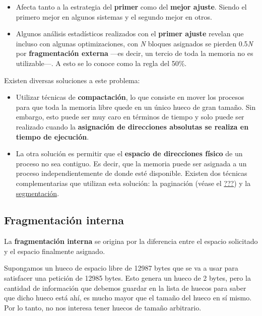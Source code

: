 \begin{itemize}
\item
  Afecta tanto a la estrategia del \textbf{primer} como del
  \textbf{mejor ajuste}. Siendo el primero mejor en algunos sistemas y
  el segundo mejor en otros.
\item
  Algunos análisis estadísticos realizados con el \textbf{primer ajuste}
  revelan que incluso con algunas optimizaciones, con \emph{N} bloques
  asignados se pierden 0.5\emph{N} por \textbf{fragmentación externa}
  ---es decir, un tercio de toda la memoria no es utilizable---. A esto
  se lo conoce como la regla del 50\%.
\end{itemize}

Existen diversas soluciones a este problema:

\begin{itemize}
\item
  Utilizar técnicas de \textbf{{}compactación}, lo que consiste en mover
  los procesos para que toda la memoria libre quede en un único hueco de
  gran tamaño. Sin embargo, esto puede ser muy caro en términos de
  tiempo y solo puede ser realizado cuando la \textbf{asignación de
  direcciones absolutas se realiza en tiempo de ejecución}.
\item
  La otra solución es permitir que el \textbf{espacio de direcciones
  físico} de un proceso no sea contiguo. Es decir, que la memoria puede
  ser asignada a un proceso independientemente de donde esté disponible.
  Existen dos técnicas complementarias que utilizan esta solución: la
  paginación (véase el \hyperref[paginaciuxf3n]{???}) y la
  \href{https://es.wikipedia.org/wiki/Segmentaci\%C3\%B3n_de_memoria}{segmentación}.
\end{itemize}

\subsection{Fragmentación interna}\label{_fragmentaciuxf3n_interna}

{} La \textbf{fragmentación interna} se origina por la diferencia entre
el espacio solicitado y el espacio finalmente asignado.

Supongamos un hueco de espacio libre de 12987 bytes que se va a usar
para satisfacer una petición de 12985 bytes. Esto genera un hueco de 2
bytes, pero la cantidad de información que debemos guardar en la lista
de huecos para saber que dicho hueco está ahí, es mucho mayor que el
tamaño del hueco en sí mismo. Por lo tanto, no nos interesa tener huecos
de tamaño arbitrario.

